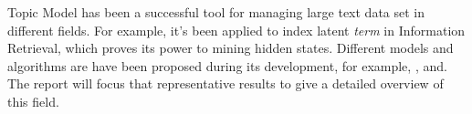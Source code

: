 Topic Model has been a successful tool for managing large text data set in different fields. For example, it's been applied to index latent \emph{term} in Information Retrieval\cite{deerwester1990indexing}, which proves its power to mining hidden states. Different models and algorithms are have been proposed during its development, for example, \cite{dumais1995latent}, \cite{blei2003latent}and\cite{hofmann1999probabilistic}. The report will focus that representative results to give a detailed overview of this field. 
